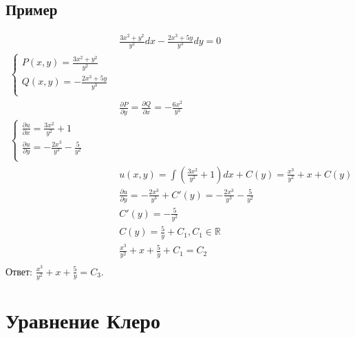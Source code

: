 \documentclass[fontsize=10pt,a4paper,fleqn]{scrreprt} %
\numberwithin{equation}{section}
\begin{document}
\subsection{Пример}

\begin{align*}
&  \frac{3x^2+y^2}{y^2}dx - \frac{2x^3+5y}{y^3}dy = 0 \\
  \begin{cases}
    P(x,y) =\frac{3x^2+y^2}{y^2}\\
    Q(x,y) = -\frac{2x^3+5y}{y^3}\\
  \end{cases}\\
&  \frac{\partial P}{\partial y} = \frac{\partial Q}{\partial x} = -\frac{6x^2}{y^3}\\
  \begin{cases}
    \frac{\partial u}{\partial x} = \frac{3x^2}{y^2} + 1\\
    \frac{\partial u}{\partial y} = -\frac{2x^3}{y^3} - \frac5{y^2}\\
  \end{cases}\\
&  u(x,y) = \int\left(\frac{3x^2}{y^2} +1 \right)dx +C(y) =  \frac{x^3}{y^2} + x +C(y)\\
& \frac{\partial u}{\partial y} = -\frac{2x^3}{y^3} + C'(y) = -\frac{2x^3}{y^3} - \frac5{y^2}\\
& C'(y) = -\frac5{y^2}\\
& C(y) = \frac5y + C_1, C_1 \in \mathbb{R}\\
&\frac{x^3}{y^2} + x+ \frac5y + C_1 = C_2\\
\end{align*}
Ответ: $ \frac{x^3}{y^2} + x+ \frac5y = C_3.$

\section{Уравнение Клеро}
\label{sec:clerau}
\end{document}

